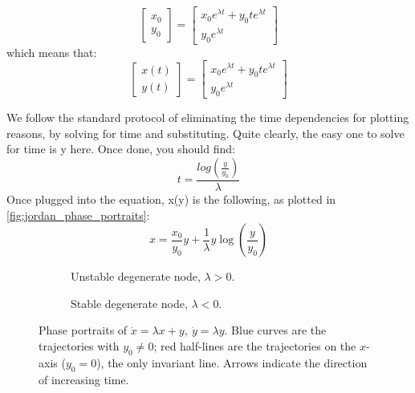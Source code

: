 \begin{example}
\begin{equation*}
\begin{bmatrix}
            x_0 \\ y_0
        \end{bmatrix}=\begin{bmatrix}
            x_0e^{\lambda t}+y_0 te^{\lambda t} \\
            y_0e^{\lambda t}
        \end{bmatrix}
    \end{equation*}
    which means that:
    \begin{equation*}
        \begin{bmatrix}
            x(t) \\ y(t)
        \end{bmatrix}=\begin{bmatrix}
            x_0e^{\lambda t}+y_0te^{\lambda t} \\ y_0e^{\lambda t}
        \end{bmatrix}
    \end{equation*}

    We follow the standard protocol of eliminating the time dependencies for plotting reasons, by solving for time and substituting. Quite clearly, the easy one to solve for time is y here. Once done, you should find:\begin{equation*}
        t=\frac{log(\frac{y}{y_0})}{\lambda}
    \end{equation*}
    Once plugged into the equation, x(y) is the following, as plotted in \autoref{fig:jordan_phase_portraits}:
    \begin{equation*}
        x=\frac{x_0}{y_0}y+\frac{1}{\lambda}y\log(\frac{y}{y_0})
    \end{equation*}
    \begin{figure}[ht]
    \centering
    \begin{subfigure}[t]{0.45\textwidth}
        \centering
        \caption{Unstable degenerate node, $\lambda>0$.}
    \end{subfigure}\hfill
    \begin{subfigure}[t]{0.45\textwidth}
        \centering
        \caption{Stable degenerate node, $\lambda<0$.}
    \end{subfigure}

    \caption{Phase portraits of $\dot{x}=\lambda x+y,\ \dot{y}=\lambda y$. Blue curves are
    the trajectories with $y_0\neq0$; red half-lines are the trajectories on the $x$-axis
    ($y_0=0$), the only invariant line. Arrows indicate the direction of increasing time.}
    \label{fig:jordan_phase_portraits}
\end{figure}
\end{example}


